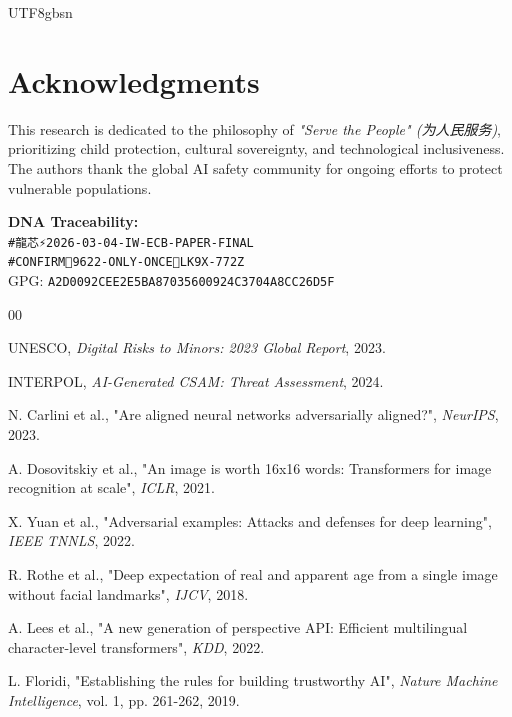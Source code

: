 \documentclass[conference]{IEEEtran}
\begin{document}
\begin{CJK}{UTF8}{gbsn}
\section*{Acknowledgments}

This research is dedicated to the philosophy of \textit{"Serve the People" (为人民服务)}, prioritizing child protection, cultural sovereignty, and technological inclusiveness. The authors thank the global AI safety community for ongoing efforts to protect vulnerable populations.

\textbf{DNA Traceability:} \\
\texttt{\#龍芯⚡️2026-03-04-IW-ECB-PAPER-FINAL} \\
\texttt{\#CONFIRM🌌9622-ONLY-ONCE🧬LK9X-772Z} \\
GPG: \texttt{A2D0092CEE2E5BA87035600924C3704A8CC26D5F}

\begin{thebibliography}{00}

 UNESCO, \textit{Digital Risks to Minors: 2023 Global Report}, 2023.

 INTERPOL, \textit{AI-Generated CSAM: Threat Assessment}, 2024.

 N. Carlini et al., "Are aligned neural networks adversarially aligned?", \textit{NeurIPS}, 2023.

 A. Dosovitskiy et al., "An image is worth 16x16 words: Transformers for image recognition at scale", \textit{ICLR}, 2021.

 X. Yuan et al., "Adversarial examples: Attacks and defenses for deep learning", \textit{IEEE TNNLS}, 2022.

 R. Rothe et al., "Deep expectation of real and apparent age from a single image without facial landmarks", \textit{IJCV}, 2018.

 A. Lees et al., "A new generation of perspective API: Efficient multilingual character-level transformers", \textit{KDD}, 2022.

 L. Floridi, "Establishing the rules for building trustworthy AI", \textit{Nature Machine Intelligence}, vol. 1, pp. 261-262, 2019.


\end{thebibliography}
\end{CJK}
\end{document}
